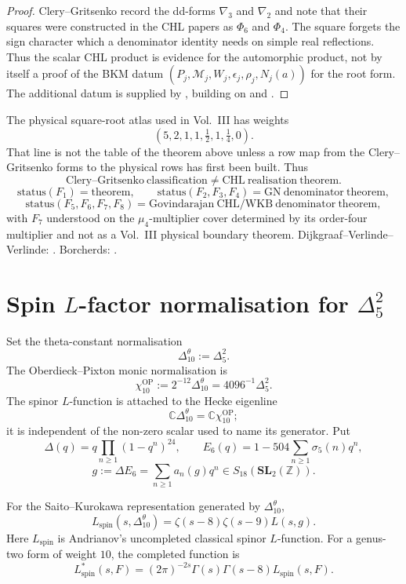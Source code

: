 \documentclass[11pt]{memoir}
\renewcommand{\thesection}{\arabic{section}}
\renewcommand{\theHsection}{\arabic{section}}
\newcommand{\Z}{\mathbb{Z}} \newcommand{\C}{\mathbb{C}}
\newcommand{\SL}{\mathbf{SL}}
\begin{document}
\begin{proof}
Clery--Gritsenko record the dd-forms $\nabla_3$ and $\nabla_2$ and note
that their squares were constructed in the CHL papers as $\Phi_6$ and
$\Phi_4$.  The square forgets the sign character which a denominator
identity needs on simple real reflections.  Thus the scalar CHL product
is evidence for the automorphic product, not by itself a proof of the
BKM datum $(P_j,\mathcal M_j,W_j,\epsilon_j,\rho_j,N_j(a))$ for the
root form.  The additional datum is supplied by
\cite{Gov11BKM}, building on \cite{GK09CHL} and \cite{CD09BKM}.
\end{proof}

The physical square-root atlas used in Vol.~III has weights
$$
(5,2,1,1,\tfrac12,1,\tfrac14,0).
$$
That line is not the table of the theorem above unless a row map from
the Clery--Gritsenko forms to the physical rows has first been built.
Thus
$$\mathrm{Clery\mbox{--}Gritsenko\ classification}\neq
\mathrm{CHL\ realisation\ theorem}.$$
$$\mathrm{status}(F_1)=\mathrm{theorem},\qquad
\mathrm{status}(F_2,F_3,F_4)=\mathrm{GN\ denominator\ theorem},$$
$$\mathrm{status}(F_5,F_6,F_7,F_8)
=\mathrm{Govindarajan\ CHL/WKB\ denominator\ theorem},$$
with $F_7$ understood on the $\mu_4$-multiplier cover determined by its
order-four multiplier and not as a Vol.~III physical boundary theorem.
Dijkgraaf--Verlinde--Verlinde: \cite{DVV}.  Borcherds: \cite{B}.

\appendix
\renewcommand{\thesection}{\Alph{section}}
\renewcommand{\theHsection}{appendix.\Alph{section}}

\section{\texorpdfstring{Spin \(L\)-factor normalisation for \(\Delta_5^2\)}
{Spin L-factor normalisation for Delta5 squared}}
\label{app:sk-shadow}

Set the theta-constant normalisation
$$\Delta_{10}^{\theta}:=\Delta_5^2.$$
The Oberdieck--Pixton monic normalisation is
$$\chi_{10}^{\mathrm{OP}}:=2^{-12}\Delta_{10}^{\theta}
=4096^{-1}\Delta_5^2.$$
The spinor $L$-function is attached to the Hecke eigenline
$$\C\Delta_{10}^{\theta}=\C\chi_{10}^{\mathrm{OP}};$$
it is independent of the non-zero scalar used to name its generator.
Put
$$\Delta(q)=q\prod_{n\geq1}(1-q^n)^{24},\qquad
E_6(q)=1-504\sum_{n\geq1}\sigma_5(n)q^n,$$
$$g:=\Delta E_6=\sum_{n\geq1}a_n(g)q^n\in S_{18}(\SL_2(\Z)).$$

\begin{theorem}
\label{thm:andrianov-factor}
For the Saito--Kurokawa representation generated by
$\Delta_{10}^{\theta}$,
$$L_{\mathrm{spin}}(s,\Delta_{10}^{\theta})
=\zeta(s-8)\zeta(s-9)L(s,g).$$
Here \(L_{\mathrm{spin}}\) is Andrianov's uncompleted classical spinor
\(L\)-function.  For a genus-two form of weight \(10\), the completed
function is
$$
L_{\mathrm{spin}}^*(s,F)
=(2\pi)^{-2s}\Gamma(s)\Gamma(s-8)L_{\mathrm{spin}}(s,F).
$$
\end{theorem}
\end{document}
